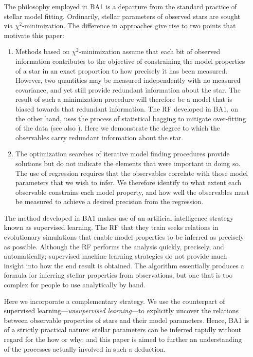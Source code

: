 The philosophy employed in BA1 is a departure from the standard practice of stellar model fitting. Ordinarily, stellar parameters of observed stars are sought via $\chi^2$-minimization.
The difference in approaches give rise to two points that motivate this paper:
\begin{enumerate}

    \item Methods based on $\chi^2$-minimization assume that each bit of observed information contributes to the objective of constraining the model properties of a star in an exact proportion to how precisely it has been measured. However, two quantities may be measured independently with no measured covariance, and yet still provide redundant information about the star. The result of such a minimization procedure will therefore be a model that is biased towards that redundant information.  The RF developed in BA1, on the other hand, uses the process of statistical bagging to mitigate over-fitting of the data (see also \citealt{hastie2005elements}).  Here we demonstrate the degree to which the observables  carry redundant information about the star. 

    \item The %
    optimization searches of iterative model finding procedures provide solutions but do not indicate the elements that were important in doing so. The use of regression requires that the observables correlate with those model parameters that we wish to infer.  We therefore identify to what extent each observable constrains each model property, and how well the observables must be measured to achieve a desired precision from the regression.  
    
\end{enumerate}


The method developed in BA1 makes use of an artificial intelligence strategy known as supervised learning. The RF that they train seeks relations in evolutionary simulations that enable model properties to be inferred as precisely as possible. Although the RF performs the analysis quickly, precisely, and automatically; supervised machine learning strategies do not provide much insight into how the end result is obtained. The algorithm essentially produces a formula for inferring stellar properties from observations, but one that is too complex for people to use analytically by hand. 

Here we incorporate a complementary strategy. We use the counterpart of supervised learning---\emph{unsupervised learning}---to explicitly uncover the relations between observable properties of stars and their model parameters. Hence, BA1 is of a strictly practical nature: stellar parameters can be inferred rapidly without regard for the how or why; and this paper is aimed to further an understanding of the processes actually involved in such a deduction. 

